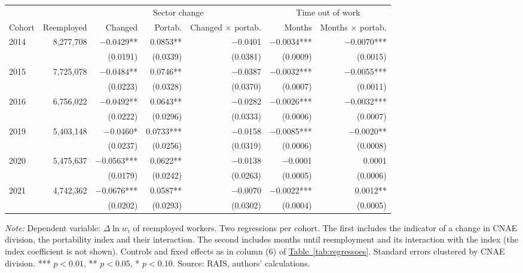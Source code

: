 {\footnotesize
\begin{threeparttable}
\begin{tabular}{lrrrrrr}
\toprule
 & & \multicolumn{3}{c}{Sector change} & \multicolumn{2}{c}{Time out of work} \\
\cmidrule(lr){3-5}\cmidrule(lr){6-7}
Cohort & Reemployed & Changed & Portab. & Changed $\times$ portab. & Months & Months $\times$ portab. \\
\midrule
2014 & 8,277,708 & $-$0.0429** & 0.0853** & $-$0.0401 & $-$0.0034*** & $-$0.0070*** \\
 &  & (0.0191) & (0.0339) & (0.0381) & (0.0009) & (0.0015) \\
2015 & 7,725,078 & $-$0.0484** & 0.0746** & $-$0.0387 & $-$0.0032*** & $-$0.0055*** \\
 &  & (0.0223) & (0.0328) & (0.0370) & (0.0007) & (0.0011) \\
2016 & 6,756,022 & $-$0.0492** & 0.0643** & $-$0.0282 & $-$0.0026*** & $-$0.0032*** \\
 &  & (0.0222) & (0.0296) & (0.0333) & (0.0006) & (0.0007) \\
2019 & 5,403,148 & $-$0.0460* & 0.0733*** & $-$0.0158 & $-$0.0085*** & $-$0.0020** \\
 &  & (0.0237) & (0.0256) & (0.0319) & (0.0006) & (0.0008) \\
2020 & 5,475,637 & $-$0.0563*** & 0.0622** & $-$0.0138 & $-$0.0001 & 0.0001 \\
 &  & (0.0179) & (0.0242) & (0.0263) & (0.0005) & (0.0006) \\
2021 & 4,742,362 & $-$0.0676*** & 0.0587** & $-$0.0070 & $-$0.0022*** & 0.0012** \\
 &  & (0.0202) & (0.0293) & (0.0302) & (0.0004) & (0.0005) \\
\bottomrule
\end{tabular}
\begin{tablenotes}[flushleft]\footnotesize
\item \textit{Note:} Dependent variable: $\Delta \ln w_i$ of reemployed workers. Two regressions per cohort. The first includes the indicator of a change in CNAE division, the portability index and their interaction. The second includes months until reemployment and its interaction with the index (the index coefficient is not shown). Controls and fixed effects as in column (6) of \hyperref[tab:regressoes]{Table~\ref*{tab:regressoes}}. Standard errors clustered by CNAE division. *** $p<0.01$, ** $p<0.05$, * $p<0.10$. Source: RAIS, authors' calculations.
\end{tablenotes}
\end{threeparttable}
}
